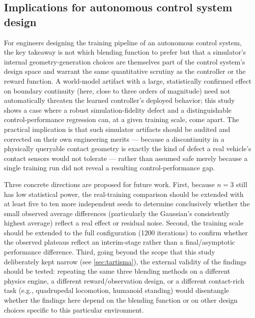 \subsection*{Implications for autonomous control system design}
For engineers designing the training pipeline of an autonomous control
system, the key takeaway is not which blending function to prefer but
that a simulator's internal geometry-generation choices are themselves
part of the control system's design space and warrant the same
quantitative scrutiny as the controller or the reward function. A
world-model artifact with a large, statistically confirmed effect on
boundary continuity (here, close to three orders of magnitude) need not
automatically threaten the learned controller's deployed behavior; this
study shows a case where a robust simulation-fidelity defect and a
distinguishable control-performance regression can, at a given training
scale, come apart. The practical implication is that such simulator
artifacts should be audited and corrected on their own engineering
merits --- because a discontinuity in a physically queryable contact
geometry is exactly the kind of defect a real vehicle's contact sensors
would not tolerate --- rather than assumed safe merely because a single
training run did not reveal a resulting control-performance gap.

Three concrete directions are proposed for future work. First, because
$n=3$ still has low statistical power, the real-training comparison
should be extended with at least five to ten more independent seeds to
determine conclusively whether the small observed average differences
(particularly the Gaussian's consistently highest average) reflect a
real effect or residual noise. Second, the training scale should be
extended to the full configuration (1200 iterations) to confirm whether
the observed plateaus reflect an interim-stage rather than a
final/asymptotic performance difference. Third, going beyond the scope
that this study deliberately kept narrow (see \cref{sec:tartisma}), the
external validity of the findings should be tested: repeating the same
three blending methods on a different physics engine, a different
reward/observation design, or a different contact-rich task (e.g.,
quadrupedal locomotion, humanoid standing) would disentangle whether the
findings here depend on the blending function or on other design choices
specific to this particular environment.
